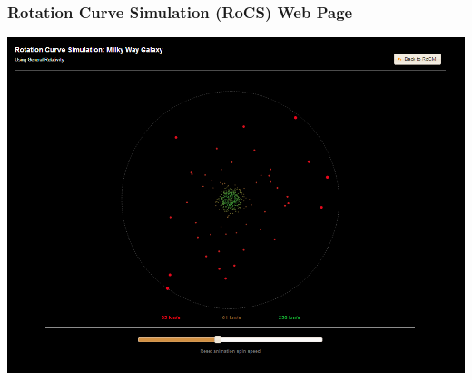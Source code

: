\documentclass[titlepage]{article}
\begin{document}
\subsubsection{Rotation Curve Simulation (RoCS) Web Page}
\begin{center}
\includegraphics[scale=0.5]{gui/rocs.png}
\end{center}
\end{document}
